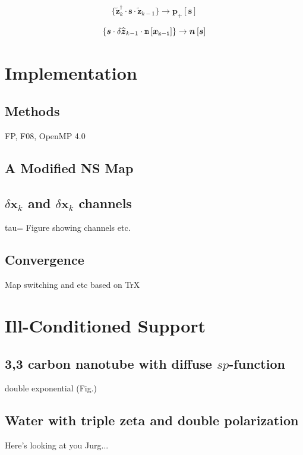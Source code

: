 \documentclass[letterpaper,twocolumn,amsmath,amsfont,amssymb,english,aps,jcp,preprintnumbers,groupaddress,nofootinbib,tightenlines]{revtex4}
\newcommand{\mat}[1]{\boldsymbol{#1}}
\begin{document}
\begin{equation}
 \{ \widetilde{\mat{z}}^\dagger_{k} \cdot \mat{s} \cdot  \widetilde{\mat{z}}_{k-1} \} 
\rightarrow \mat{p}_+\left[\mat{s} \right]
\end{equation}

\begin{equation}
\{ \mat{s} \cdot \delta {\widehat{\mat{z}}}_{k-1}
\cdot \tt{m}\left[\mat{x}_{k-1} \right]    \} 
\rightarrow \mat{n}\left[\mat{s} \right]
\end{equation}

\section{Implementation}

\subsection{Methods}
FP, F08, OpenMP 4.0

\subsection{A Modified NS Map}

\subsection{$\delta \mat{x}_k$ and $\delta \mat{x}_k$ channels}
tau= Figure showing channels etc.  

\subsection{Convergence}
Map switching and etc based on TrX


\section{Ill-Conditioned Support}

\subsection{ 3,3 carbon nanotube with diffuse $sp$-function}
double exponential (Fig.)

\subsection{Water with triple zeta and double polarization}
Here's looking at you Jurg...
\end{document}
